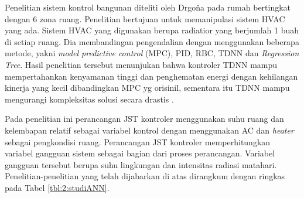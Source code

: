 Penelitian sistem kontrol bangunan diteliti oleh Drgoňa pada rumah bertingkat dengan 6 zona ruang. Penelitian bertujuan untuk memanipulasi sistem HVAC yang ada. Sistem HVAC yang digunakan berupa radiatior yang berjumlah 1 buah di setiap ruang. Dia membandingan pengendalian dengan menggunakan beberapa metode, yakni \textit{model predictive control} (MPC), PID, RBC, TDNN dan \textit{Regression Tree}. Hasil penelitian tersebut menunjukan bahwa kontroler TDNN mampu mempertahankan kenyamanan tinggi dan penghematan energi dengan kehilangan kinerja yang kecil dibandingkan MPC yg orisinil, sementara itu TDNN mampu mengurangi kompleksitas solusi secara drastis \cite{paper22JanDrgona}.

Pada penelitian ini perancangan JST kontroler menggunakan suhu ruang dan kelembapan relatif sebagai variabel kontrol dengan menggunakan AC dan \textit{heater} sebagai pengkondisi ruang. Perancangan JST kontroler memperhitungkan variabel gangguan sistem sebagai bagian dari proses perancangan. Variabel gangguan tersebut berupa suhu lingkungan dan intensitas radiasi matahari. Penelitian-penelitian yang telah dijabarkan di atas dirangkum dengan ringkas pada Tabel \ref{tbl:2:studiANN}.

